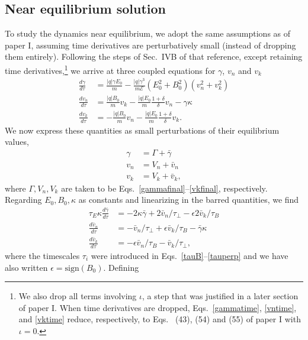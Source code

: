 \documentclass[amsmath,amssymb,nofootinbib,notitlepage,superscriptaddress,twocolumn]{revtex4-2}
\begin{document}
\subsection{Near equilibrium solution}\label{sec:near-equilibrium}

To study the dynamics near equilibrium, we adopt the same assumptions as of paper I, assuming time derivatives are perturbatively small (instead of dropping them entirely).  Following the steps of Sec.~IVB of that reference, except retaining time derivatives,\footnote{We also drop all terms involving $\iota$, a step that was justified in a later section of paper I.  When time derivatives are dropped, Eqs.~\eqref{gammatime}, \eqref{vntime}, and \eqref{vktime} reduce, respectively, to Eqs.~ (43), (54) and (55) of paper I with $\iota=0$.} we arrive at three coupled equations for $\gamma$, $v_n$ and $v_k$
\begin{align}
    \frac{d\gamma}{d\tau}&=\frac{|q|\gamma E_0}{m}-\frac{|q|\gamma^3}{m\mathcal{E}}(E_0^2+B_0^2)(v_{n}^2+v_k^2)\label{gammatime} \\
    \frac{d v_n}{d\tau}&= \frac{|q|B_0}{m}v_k-\frac{|q|E_0}{m}\frac{1+\delta}{\delta}v_n-\gamma \kappa \label{vntime} \\
    \frac{d v_k}{d\tau}&=-\frac{|q|B_0}{m}v_n-\frac{|q|E_0}{m}\frac{1+\delta}{\delta}v_k. \label{vktime}
\end{align}
We now express these quantities as small perturbations of their equilibrium values,
\begin{align}
    \gamma&=\Gamma+\bar{\gamma}\\
    v_n&=V_n+\bar{v}_n\\
    v_k&=V_k+\bar{v}_k,
\end{align}
where $\Gamma, V_n, V_k$ are taken to be Eqs.~\eqref{gammafinal}--\eqref{vkfinal}, respectively.  Regarding $E_0,B_0,\kappa$ as constants and linearizing in the barred quantities, we find
\begin{align}
    \tau_E \kappa \frac{d\bar{\gamma}}{d\tau}&=-2 \kappa \bar{\gamma}+2\bar{v}_n/\tau_{\perp}-\epsilon2\bar{v}_k/\tau_B\\
    \frac{d\bar{v}_n}{d\tau}&=-\bar{v}_n/\tau_{\perp}+\epsilon\bar{v}_k/\tau_B-\bar{\gamma}\kappa\\
    \frac{d\bar{v}_k}{d\tau}&=-\epsilon\bar{v}_n/\tau_B-\bar{v}_k/\tau_{\perp},
\end{align}
where the timescales $\tau_i$ were introduced in Eqs.~\eqref{tauB}--\eqref{tauperp} and we have also written $\epsilon = \textrm{sign}(B_0)$.  Defining
\end{document}
